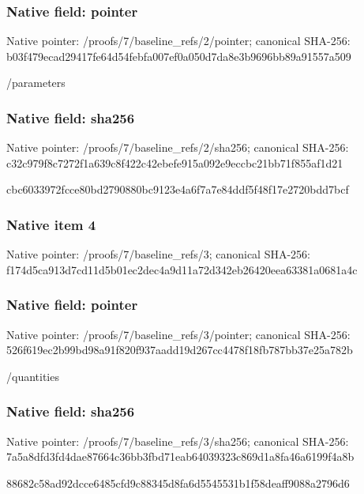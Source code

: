 \documentclass[10pt,a4paper]{article}
\begin{document}
\subsubsection{Native field: pointer}
Native pointer: /proofs/7/baseline\_\allowbreak{}refs/2/pointer; canonical SHA-256: b03f479ecad29417fe64d54febfa007ef0a050d7da8e3b9696bb89a91557a509

\begingroup\raggedright\sloppy /\allowbreak{}parameters\par\endgroup

\subsubsection{Native field: sha256}
Native pointer: /proofs/7/baseline\_\allowbreak{}refs/2/sha256; canonical SHA-256: c32c979f8c7272f1a639c8f422c42ebefe915a092e9eccbc21bb71f855af1d21

\begingroup\raggedright\sloppy cbc6033972fcce80bd2790880bc9123e4a6f7a7e84ddf5f48f17e2720bdd7bcf\par\endgroup

\subsubsection{Native item 4}
Native pointer: /proofs/7/baseline\_\allowbreak{}refs/3; canonical SHA-256: f174d5ca913d7cd11d5b01ec2dec4a9d11a72d342eb26420eea63381a0681a4c

\subsubsection{Native field: pointer}
Native pointer: /proofs/7/baseline\_\allowbreak{}refs/3/pointer; canonical SHA-256: 526f619ec2b99bd98a91f820f937aadd19d267cc4478f18fb787bb37e25a782b

\begingroup\raggedright\sloppy /\allowbreak{}quantities\par\endgroup

\subsubsection{Native field: sha256}
Native pointer: /proofs/7/baseline\_\allowbreak{}refs/3/sha256; canonical SHA-256: 7a5a8dfd3fd4dae87664c36bb3fbd71eab64039323c869d1a8fa46a6199f4a8b

\begingroup\raggedright\sloppy 88682c58ad92dcce6485cfd9c88345d8fa6d5545531b1f58deaff9088a2796d6\par\endgroup
\end{document}
